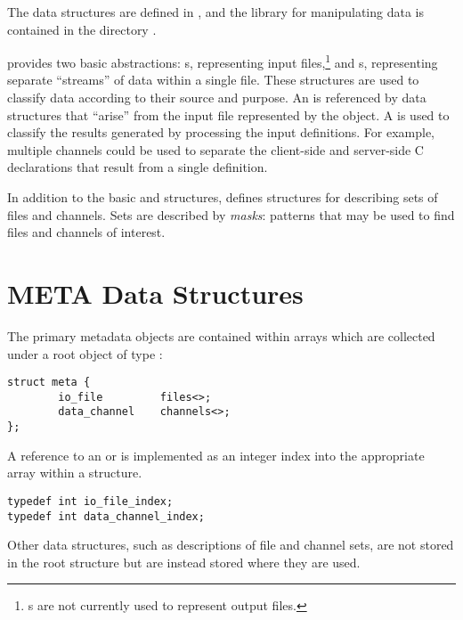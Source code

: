 The \META{} data structures are defined in , and the
library for manipulating \META{} data is contained in the directory
.

\META{} provides two basic abstractions: s, representing input
files,\footnote{s are not currently used to represent output
files.} and s, representing separate ``streams'' of data
within a single file.  These structures are used to classify data according to
their source and purpose.  An  is referenced by data structures
that ``arise'' from the input file represented by the  object.
A  is used to classify the results generated by processing
the input definitions.  For example, multiple channels could be used to
separate the client-side and server-side C declarations that result from a
single \IDL{} definition.

In addition to the basic  and  structures,
\META{} defines structures for describing sets of files and channels.  Sets are
described by \emph{masks}: patterns that may be used to find files and channels
of interest.



\section{META Data Structures}
\label{sec:META:META Data Structures}

The primary metadata objects are contained within arrays which are collected
under a root object of type :

\begin{verbatim}
struct meta {
        io_file         files<>;
        data_channel    channels<>;
};
\end{verbatim}

\noindent A reference to an  or  is
implemented as an integer index into the appropriate array within a
 structure.

\begin{verbatim}
typedef int io_file_index;
typedef int data_channel_index;
\end{verbatim}

\noindent Other \META{} data structures, such as descriptions of file and
channel sets, are not stored in the root  structure but are instead
stored where they are used.

